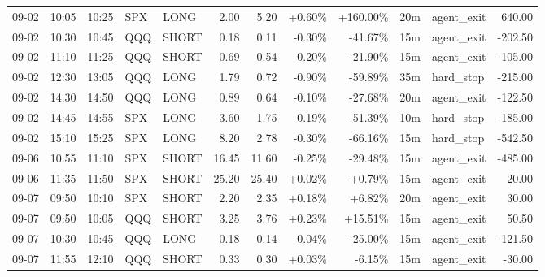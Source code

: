 \documentclass[11pt,a4paper]{article}
\begin{document}
\begin{center}
\begin{longtable}{>{\color{txtmain}}l l l l l r r r r r >{\color{txtmain}}l r}
09-02 & 10:05 & 10:25 & SPX & LONG & 2.00 & 5.20 & \textcolor{wingreen}{+0.60\%} & \textcolor{wingreen}{+160.00\%} & 20m & agent\_exit & \textcolor{wingreen}{640.00} \\
09-02 & 10:30 & 10:45 & QQQ & SHORT & 0.18 & 0.11 & \textcolor{lossred}{-0.30\%} & \textcolor{lossred}{-41.67\%} & 15m & agent\_exit & \textcolor{lossred}{-202.50} \\
09-02 & 11:10 & 11:25 & QQQ & SHORT & 0.69 & 0.54 & \textcolor{lossred}{-0.20\%} & \textcolor{lossred}{-21.90\%} & 15m & agent\_exit & \textcolor{lossred}{-105.00} \\
09-02 & 12:30 & 13:05 & QQQ & LONG & 1.79 & 0.72 & \textcolor{lossred}{-0.90\%} & \textcolor{lossred}{-59.89\%} & 35m & hard\_stop & \textcolor{lossred}{-215.00} \\
09-02 & 14:30 & 14:50 & QQQ & LONG & 0.89 & 0.64 & \textcolor{lossred}{-0.10\%} & \textcolor{lossred}{-27.68\%} & 20m & agent\_exit & \textcolor{lossred}{-122.50} \\
09-02 & 14:45 & 14:55 & SPX & LONG & 3.60 & 1.75 & \textcolor{lossred}{-0.19\%} & \textcolor{lossred}{-51.39\%} & 10m & hard\_stop & \textcolor{lossred}{-185.00} \\
09-02 & 15:10 & 15:25 & SPX & LONG & 8.20 & 2.78 & \textcolor{lossred}{-0.30\%} & \textcolor{lossred}{-66.16\%} & 15m & hard\_stop & \textcolor{lossred}{-542.50} \\
09-06 & 10:55 & 11:10 & SPX & SHORT & 16.45 & 11.60 & \textcolor{lossred}{-0.25\%} & \textcolor{lossred}{-29.48\%} & 15m & agent\_exit & \textcolor{lossred}{-485.00} \\
09-06 & 11:35 & 11:50 & SPX & SHORT & 25.20 & 25.40 & \textcolor{wingreen}{+0.02\%} & \textcolor{wingreen}{+0.79\%} & 15m & agent\_exit & \textcolor{wingreen}{20.00} \\
09-07 & 09:50 & 10:10 & SPX & SHORT & 2.20 & 2.35 & \textcolor{wingreen}{+0.18\%} & \textcolor{wingreen}{+6.82\%} & 20m & agent\_exit & \textcolor{wingreen}{30.00} \\
09-07 & 09:50 & 10:05 & QQQ & SHORT & 3.25 & 3.76 & \textcolor{wingreen}{+0.23\%} & \textcolor{wingreen}{+15.51\%} & 15m & agent\_exit & \textcolor{wingreen}{50.50} \\
09-07 & 10:30 & 10:45 & QQQ & LONG & 0.18 & 0.14 & \textcolor{lossred}{-0.04\%} & \textcolor{lossred}{-25.00\%} & 15m & agent\_exit & \textcolor{lossred}{-121.50} \\
09-07 & 11:55 & 12:10 & QQQ & SHORT & 0.33 & 0.30 & \textcolor{wingreen}{+0.03\%} & \textcolor{lossred}{-6.15\%} & 15m & agent\_exit & \textcolor{lossred}{-30.00} \\

\end{longtable}
\end{center}
\end{document}
